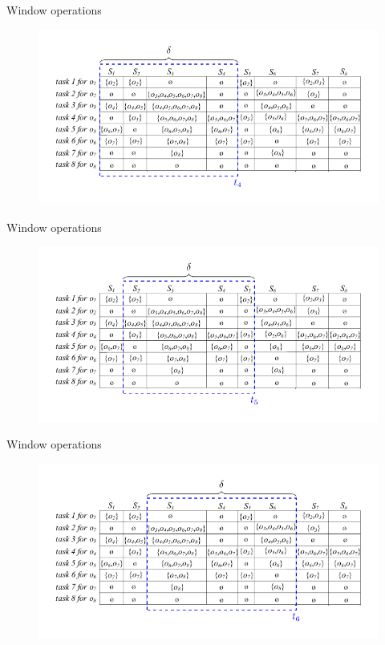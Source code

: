\documentclass{beamer}
\begin{document}
\begin{frame}{Window operations}
    \centering
    \begin{figure}
        \includegraphics[width=.9\textwidth]{figures/Window01}
    \end{figure}    
\end{frame}
\begin{frame}{Window operations}
    \centering
    \begin{figure}
        \includegraphics[width=.9\textwidth]{figures/Window02}
    \end{figure}    
\end{frame}
\begin{frame}{Window operations}
    \centering
    \begin{figure}
        \includegraphics[width=.9\textwidth]{figures/Window03}
    \end{figure}    
\end{frame}
\end{document}
